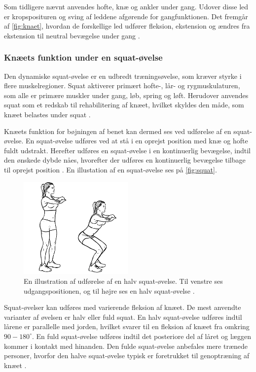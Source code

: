 Som tidligere nævnt anvendes hofte, knæ og ankler under gang. Udover disse led er kropsposituren og sving af leddene afgørende for gangfunktionen. Det fremgår af \autoref{fig:knaet}, hvordan de forskellige led udfører fleksion, ekstension og ændres fra ekstension til neutral bevægelse under gang \citep{martini2012}.

\subsubsection{Knæets funktion under en squat-øvelse} \label{sec:knaeled_squat}
Den dynamiske squat-øvelse er en udbredt træningsøvelse, som kræver styrke i flere muskelregioner. Squat aktiverer primært hofte-, lår- og rygmuskulaturen, som alle er primære muskler under gang, løb, spring og løft. Herudover anvendes squat som et redskab til rehabilitering af knæet, hvilket skyldes den måde, som knæet belastes under squat \citep{escamilla2001}. 

Knæets funktion for bøjningen af benet kan dermed ses ved udførelse af en squat-øvelse. En squat-øvelse udføres ved at stå i en oprejst position med knæ og hofte fuldt udstrakt. Herefter udføres en squat-øvelse i en kontinuerlig bevægelse, indtil den ønskede dybde nåes, hvorefter der udføres en kontinuerlig bevægelse tilbage til oprejst position \citep{escamilla2001}. En illustation af en squat-øvelse ses på \autoref{fig:squat}.

\begin{figure}[H]
\centering
\includegraphics[width=0.5\textwidth]{figures/squat.png}
\caption{En illustration af udførelse af en halv squat-øvelse. Til venstre ses udgangspositionen, og til højre ses en halv squat-øvelse \citep{squat2015}.}
\label{fig:squat}
\end{figure}

\noindent 
Squat-øvelser kan udføres med varierende fleksion af knæet. De mest anvendte varianter af øvelsen er halv eller fuld squat. En halv squat-øvelse udføres indtil lårene er parallelle med jorden, hvilket svarer til en fleksion af knæet fra omkring $90-180^{\circ}$. En fuld squat-øvelse udføres indtil det posteriore del af låret og læggen kommer i kontakt med hinanden. Den fulde squat-øvelse anbefales mere trænede personer, hvorfor den halve squat-øvelse typisk er foretrukket til genoptræning af knæet \citep{escamilla2001}.

